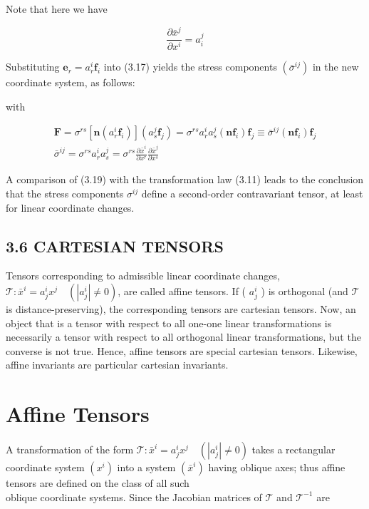 \documentclass[10pt]{article}
\begin{document}
Note that here we have

$$
\frac{\partial \bar{x}^{j}}{\partial x^{i}}=a_{i}^{j}
$$

Substituting $\mathbf{e}_{r}=a_{r}^{i} \mathbf{f}_{i}$ into (3.17) yields the stress components $\left(\bar{\sigma}^{i j}\right)$ in the new coordinate system, as follows:

with


\begin{gather*}
\mathbf{F}=\sigma^{r s}\left[\mathbf{n}\left(a_{r}^{i} \mathbf{f}_{i}\right)\right]\left(a_{s}^{j} \mathbf{f}_{j}\right)=\sigma^{r s} a_{r}^{i} a_{s}^{j}\left(\mathbf{n f}_{i}\right) \mathbf{f}_{j} \equiv \bar{\sigma}^{i j}\left(\mathbf{n f}_{i}\right) \mathbf{f}_{j} \\
\bar{\sigma}^{i j}=\sigma^{r s} a_{r}^{i} a_{s}^{j}=\sigma^{r s} \frac{\partial \bar{x}^{i}}{\partial x^{r}} \frac{\partial \bar{x}^{j}}{\partial x^{s}} \tag{3.19}
\end{gather*}


A comparison of (3.19) with the transformation law (3.11) leads to the conclusion that the stress components $\sigma^{i j}$ define a second-order contravariant tensor, at least for linear coordinate changes.

\subsection*{3.6 CARTESIAN TENSORS}
Tensors corresponding to admissible linear coordinate changes, $\mathscr{T}: \bar{x}^{i}=a_{j}^{i} x^{j} \quad\left(\left|a_{j}^{i}\right| \neq 0\right)$, are called affine tensors. If ( $a_{j}^{i}$ ) is orthogonal (and $\mathscr{T}$ is distance-preserving), the corresponding tensors are cartesian tensors. Now, an object that is a tensor with respect to all one-one linear transformations is necessarily a tensor with respect to all orthogonal linear transformations, but the converse is not true. Hence, affine tensors are special cartesian tensors. Likewise, affine invariants are particular cartesian invariants.

\section*{Affine Tensors}
A transformation of the form $\mathscr{T}: \bar{x}^{i}=a_{j}^{i} x^{j} \quad\left(\left|a_{j}^{i}\right| \neq 0\right)$ takes a rectangular coordinate system $\left(x^{i}\right)$ into a system $\left(\bar{x}^{i}\right)$ having oblique axes; thus affine tensors are defined on the class of all such\\
oblique coordinate systems. Since the Jacobian matrices of $\mathscr{T}$ and $\mathscr{T}^{-1}$ are
\end{document}
